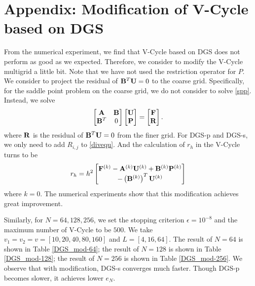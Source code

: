 \documentclass[english]{pkupaper}
\newenvironment{eqt}{\begin{equation}\begin{aligned}}{\end{aligned}\end{equation}}
\begin{document}
\section{Appendix: Modification of V-Cycle based on DGS}
\label{appendix}
From the numerical experiment, we find that V-Cycle based on DGS does not perform as good as we expected. Therefore, we consider to modify the V-Cycle multigrid a little bit. Note that we have not used the restriction operator for $P$. We consider to project the residual of $\mathbf{B}^T\mathbf{U}=0$ to the coarse grid. Specifically, for the saddle point problem on the coarse grid, we do not consider to solve \ref{spp}. Instead, we solve
\begin{equation}
\label{sppm}
\begin{bmatrix}
\mathbf{A}&\mathbf{B}\\\mathbf{B}^T&0
\end{bmatrix}\begin{bmatrix}
\mathbf{U}\\\mathbf{P}
\end{bmatrix}=\begin{bmatrix}
\mathbf{F}\\\mathbf{R}
\end{bmatrix}.
\end{equation}
where $\mathbf{R}$ is the residual of $\mathbf{B}^T\mathbf{U}=0$ from the finer grid. For DGS-p and DGS-s, we only need to add $R_{i,j}$ to \ref{divequ}. And the calculation of $r_h$ in the V-Cycle turns to be
\begin{eqt}
r_h=h^2\begin{bmatrix}\mfF^{(k)}-\mfA^{(k)} \mfU^{(k)}+\mfB^{(k)}\mfP^{(k)}\\
-\lp\mfB^{(k)}\rp^T\mfU^{(k)}\end{bmatrix}
\end{eqt}
where $k=0$. The numerical experiments show that this modification achieves great improvement.

Similarly, for $N=64, 128, 256$, we set the stopping criterion $\epsilon=10^{-8}$ and the maximum number of V-Cycle to be $500$. We take $v_1=v_2=v=[10, 20, 40, 80, 160]$ and $L=[4, 16, 64]$. The result of $N=64$ is shown in Table \ref{DGS_mod-64}; the result of $N=128$ is shown in Table \ref{DGS_mod-128}; the result of $N=256$ is shown in Table \ref{DGS_mod-256}. We observe that with modification, DGS-s converges much faster. Though DGS-p becomes slower, it achieves lower $e_N$.




\end{document}
